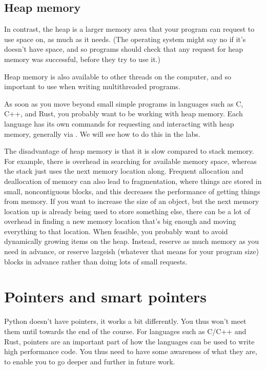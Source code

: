 \documentclass[letterpaper,10pt,british]{sphinxmanual}
\begin{document}
\subsection{Heap memory}
\label{\detokenize{chapters/programming_fundamentals/stack_and_heap:heap-memory}}
\sphinxAtStartPar
In contrast, the heap is a larger memory area that your program can request to use space on, as much as it needs. (The operating system might say no if it’s doesn’t have space, and so programs should check that any request for heap memory was successful, before they try to use it.)

\sphinxAtStartPar
Heap memory is also available to other threads on the computer, and so important to use when writing multi\sphinxhyphen{}threaded programs.

\sphinxAtStartPar
As soon as you move beyond small simple programs in languages such as C, C++, and Rust, you probably want to be working with heap memory. Each language has its own commands for requesting and interacting with heap memory, generally via {\hyperref[\detokenize{chapters/programming_fundamentals/pointers:pointers}]{}}. We will see how to do this in the labs.

\sphinxAtStartPar
The disadvantage of heap memory is that it is slow compared to stack memory. For example, there is overhead in searching for available memory space, whereas the stack just uses the next memory location along. Frequent allocation and deallocation of memory can also lead to fragmentation, where things are stored in small, non\sphinxhyphen{}contiguous blocks, and this decreases the performance of getting things from memory. If you want to increase the size of an object, but the next memory location up is already being used to store something else, there can be a lot of overhead in finding a new memory location that’s big enough and moving everything to that location. When feasible, you probably want to avoid dynamically growing items on the heap. Instead, reserve as much memory as you need in advance, or reserve large\sphinxhyphen{}ish (whatever that means for your program size) blocks in advance rather than doing lots of small requests.

\sphinxstepscope


\section{Pointers and smart pointers}
\label{\detokenize{chapters/programming_fundamentals/pointers:pointers-and-smart-pointers}}\label{\detokenize{chapters/programming_fundamentals/pointers:pointers}}\label{\detokenize{chapters/programming_fundamentals/pointers::doc}}
\sphinxAtStartPar
Python doesn’t have pointers, it works a bit differently. You thus won’t meet them until towards the end of the course. For languages such as C/C++ and Rust, pointers are an important part of how the languages can be used to write high performance code. You thus need to have some awareness of what they are, to enable you to go deeper and further in future work.
\end{document}
